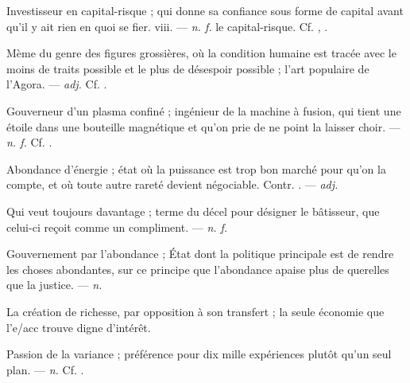  Investisseur en capital-risque ; qui donne sa confiance sous forme de capital avant qu'il y ait rien en quoi se fier.   viii. ---  \textit{n. f.} le capital-risque. Cf. , .

 Mème du genre des figures grossières, où la condition humaine est tracée avec le moins de traits possible et le plus de désespoir possible ; l'art populaire de l'Agora. ---  \textit{adj.} Cf. .

 Gouverneur d'un plasma confiné ; ingénieur de la machine à fusion, qui tient une étoile dans une bouteille magnétique et qu'on prie de ne point la laisser choir. ---  \textit{n. f.} Cf. .

 Abondance d'énergie ; état où la puissance est trop bon marché pour qu'on la compte, et où toute autre rareté devient négociable. Contr. . ---  \textit{adj.}

  Qui veut toujours davantage ; terme du décel pour désigner le bâtisseur, que celui-ci reçoit comme un compliment.   ---  \textit{n. f.}

 Gouvernement par l'abondance ; État dont la politique principale est de rendre les choses abondantes, sur ce principe que l'abondance apaise plus de querelles que la justice. ---  \textit{n.}

 La création de richesse, par opposition à son transfert ; la seule économie que l'e/acc trouve digne d'intérêt.

 Passion de la variance ; préférence pour dix mille expériences plutôt qu'un seul plan. ---  \textit{n.} Cf. .

